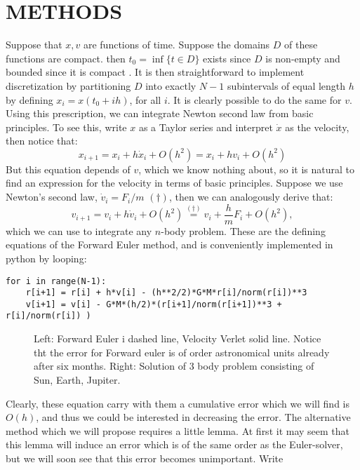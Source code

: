 \documentclass[11pt,english,a4paper]{article}
\begin{document}
\section*{\uppercase{Methods}}
Suppose that $x,v$ are functions of time. Suppose the domains $D$ of these functions are compact. then $t_0 = \inf\{t \in D\}$ exists since $D$ is non-empty and bounded since it is compact \parencite[27]{lindstrom_mathematical_2016}. It is then straightforward to implement discretization by partitioning $D$ into exactly $N-1$ subintervals of equal length $h$ by defining $x_i = x(t_0 + i h)$, for all $i$. It is clearly possible to do the same for $v$. Using this prescription, we can integrate Newton second law from basic principles. To see this, write $x$ as a Taylor series and interpret $\dot{x}$ as the velocity, then notice that:
\begin{equation}
x_{  i+1} = x_i + h \dot{x}_i + O(h^2) = x_i + h v_i + O(h^2) \label{eq:defeuler}
\end{equation}
But this equation depends of $v$, which we know nothing about, so it is natural to find an expression for the velocity in terms of basic principles. Suppose we use Newton's second law, $\dot{v}_i = F_i/m$ $(\dagger)$, then we can analogously derive that:
\begin{equation}
v_{  i+1} = v_i + h \dot{v}_i + O(h^2) \stackrel{(\dagger)}{=} v_i + \frac{h}{m}F_i + O(h^2),
\end{equation}
which we can use to integrate any $n$-body problem. These are the defining equations of the Forward Euler method, and is conveniently implemented in python by looping:
\begin{center}
\begin{lstlisting}
for i in range(N-1):
    r[i+1] = r[i] + h*v[i] - (h**2/2)*G*M*r[i]/norm(r[i])**3 
    v[i+1] = v[i] - G*M*(h/2)*(r[i+1]/norm(r[i+1])**3 + r[i]/norm(r[i]) )
\end{lstlisting}
\end{center}
\begin{figure}[!h]
% 
\caption{Left: Forward Euler i dashed line, Velocity Verlet solid line. Notice tht the error for Forward euler is of order astronomical units already after six months. Right: Solution of 3 body problem consisting of Sun, Earth, Jupiter.}\label{fig:nbody}
\end{figure}%
Clearly, these equation carry with them a cumulative error which we will find is $O(h)$, and thus we could be interested in decreasing the error. The alternative method which we will propose requires a little lemma. At first it may seem that this lemma will induce an error which is of the same order as the Euler-solver, but we will soon see that this error becomes unimportant. Write
\end{document}
